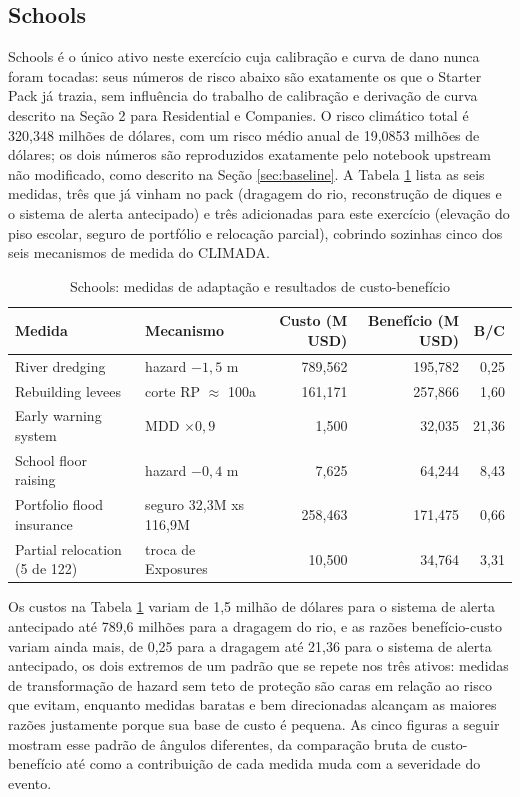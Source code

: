 \documentclass[11pt]{article}
\begin{document}
\subsection{Schools}

Schools é o único ativo neste exercício cuja calibração e curva de dano nunca foram
tocadas: seus números de risco abaixo são exatamente os que o Starter Pack já trazia,
sem influência do trabalho de calibração e derivação de curva descrito na Seção 2 para
Residential e Companies. O risco climático total é 320,348 milhões de dólares, com um
risco médio anual de 19,0853 milhões de dólares; os dois números são reproduzidos
exatamente pelo notebook upstream não modificado, como descrito na Seção
\ref{sec:baseline}. A Tabela \ref{tab:schools} lista as seis medidas, três que já vinham
no pack (dragagem do rio, reconstrução de diques e o sistema de alerta antecipado) e três
adicionadas para este exercício (elevação do piso escolar, seguro de portfólio e
relocação parcial), cobrindo sozinhas cinco dos seis mecanismos de medida do CLIMADA.

\begin{table}[H]
\centering
\caption{Schools: medidas de adaptação e resultados de custo-benefício}
\label{tab:schools}
\small
\begin{tabular}{p{3.6cm}p{3cm}rrr}
\toprule
Medida & Mecanismo & Custo (M USD) & Benefício (M USD) & B/C \\
\midrule
River dredging & hazard $-1,5$ m & 789,562 & 195,782 & 0,25 \\
Rebuilding levees & corte RP $\approx$ 100a & 161,171 & 257,866 & 1,60 \\
Early warning system & MDD $\times 0,9$ & 1,500 & 32,035 & 21,36 \\
School floor raising & hazard $-0,4$ m & 7,625 & 64,244 & 8,43 \\
Portfolio flood insurance & seguro 32,3M xs 116,9M & 258,463 & 171,475 & 0,66 \\
Partial relocation (5 de 122) & troca de Exposures & 10,500 & 34,764 & 3,31 \\
\bottomrule
\end{tabular}
\end{table}

Os custos na Tabela \ref{tab:schools} variam de 1,5 milhão de dólares para o sistema de
alerta antecipado até 789,6 milhões para a dragagem do rio, e as razões benefício-custo
variam ainda mais, de 0,25 para a dragagem até 21,36 para o sistema de alerta antecipado,
os dois extremos de um padrão que se repete nos três ativos: medidas de transformação de
hazard sem teto de proteção são caras em relação ao risco que evitam, enquanto medidas
baratas e bem direcionadas alcançam as maiores razões justamente porque sua base de custo
é pequena. As cinco figuras a seguir mostram esse padrão de ângulos diferentes, da
comparação bruta de custo-benefício até como a contribuição de cada medida muda com a
severidade do evento.
\end{document}
